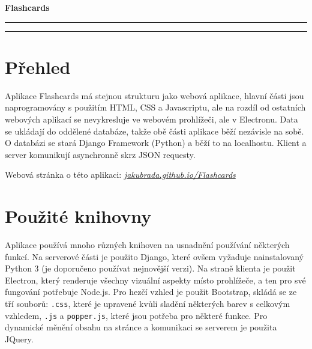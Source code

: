 \documentclass[11pt]{article}
\let\oldtexttt\texttt
\renewcommand{\texttt}[1]{\oldtexttt{\textcolor{codehighlight}{#1}}}
\begin{document}
\begin{center}
  \textbf{\Huge Flashcards}\\
  \vspace{0.2cm}
  \rule{\textwidth}{0.5pt}
\end{center}
\tableofcontents
\begin{center}
  \rule{\textwidth}{0.5pt}
\end{center}
\hypertarget{pux159ehled}{%
\section{Přehled}\label{pux159ehled}}

Aplikace Flashcards má stejnou strukturu jako webová aplikace, hlavní
části jsou naprogramovány s použitím HTML, CSS a Javascriptu, ale na
rozdíl od ostatních webových aplikací se nevykresluje ve webovém
prohlížeči, ale v Electronu. Data se ukládají do oddělené databáze,
takže obě části aplikace běží nezávisle na sobě. O databázi se stará
Django Framework (Python) a běží to na localhostu. Klient a server
komunikují asynchronně skrz JSON requesty.

Webová stránka o této aplikaci:
\href{https://jakubrada.github.io/Flashcards/}{\emph{jakubrada.github.io/Flashcards}}

\hypertarget{pouux17eituxe9-knihovny}{%
\section{Použité knihovny}\label{pouux17eituxe9-knihovny}}

Aplikace používá mnoho různých knihoven na usnadnění používání některých
funkcí. Na serverové části je použito Django, které ovšem vyžaduje
nainstalovaný Python 3 (je doporučeno používat nejnovější verzi). Na
straně klienta je použit Electron, který renderuje všechny vizuální
aspekty místo prohlížeče, a ten pro své fungování potřebuje Node.js. Pro
hezčí vzhled je použit Bootstrap, skládá se ze tří souborů:
\texttt{.css}, které je upravené kvůli sladění některých barev s
celkovým vzhledem, \texttt{.js} a \texttt{popper.js}, které jsou potřeba
pro některé funkce. Pro dynamické měnění obsahu na stránce a komunikaci
se serverem je použita JQuery.
\end{document}
